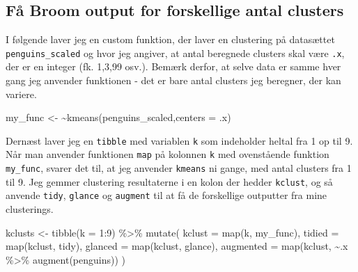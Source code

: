 \documentclass[
]{book}
\newenvironment{Shaded}{\begin{snugshade}}{\end{snugshade}}
\newcommand{\AttributeTok}[1]{\textcolor[rgb]{0.77,0.63,0.00}{#1}}
\newcommand{\DecValTok}[1]{\textcolor[rgb]{0.00,0.00,0.81}{#1}}
\newcommand{\ErrorTok}[1]{\textcolor[rgb]{0.64,0.00,0.00}{\textbf{#1}}}
\newcommand{\FunctionTok}[1]{\textcolor[rgb]{0.00,0.00,0.00}{#1}}
\newcommand{\NormalTok}[1]{#1}
\newcommand{\OtherTok}[1]{\textcolor[rgb]{0.56,0.35,0.01}{#1}}
\newcommand{\SpecialCharTok}[1]{\textcolor[rgb]{0.00,0.00,0.00}{#1}}
\begin{document}
\hypertarget{fuxe5-broom-output-for-forskellige-antal-clusters}{%
\subsection{Få Broom output for forskellige antal clusters}\label{fuxe5-broom-output-for-forskellige-antal-clusters}}

I følgende laver jeg en custom funktion, der laver en clustering på datasættet \texttt{penguins\_scaled} og hvor jeg angiver, at antal beregnede clusters skal være \texttt{.x}, der er en integer (fk. 1,3,99 osv.). Bemærk derfor, at selve data er samme hver gang jeg anvender funktionen - det er bare antal clusters jeg beregner, der kan variere.

\begin{Shaded}
\begin{Highlighting}[]
\NormalTok{my\_func }\OtherTok{\textless{}{-}} \ErrorTok{\textasciitilde{}}\FunctionTok{kmeans}\NormalTok{(penguins\_scaled,}\AttributeTok{centers =}\NormalTok{ .x)}
\end{Highlighting}
\end{Shaded}

Dernæst laver jeg en \texttt{tibble} med variablen \texttt{k} som indeholder heltal fra 1 op til 9. Når man anvender funktionen \texttt{map} på kolonnen \texttt{k} med ovenstående funktion \texttt{my\_func}, svarer det til, at jeg anvender \texttt{kmeans} ni gange, med antal clusters fra 1 til 9. Jeg gemmer clustering resultaterne i en kolon der hedder \texttt{kclust}, og så anvende \texttt{tidy}, \texttt{glance} og \texttt{augment} til at få de forskellige outputter fra mine clusterings.

\begin{Shaded}
\begin{Highlighting}[]
\NormalTok{kclusts }\OtherTok{\textless{}{-}} 
  \FunctionTok{tibble}\NormalTok{(}\AttributeTok{k =} \DecValTok{1}\SpecialCharTok{:}\DecValTok{9}\NormalTok{) }\SpecialCharTok{\%\textgreater{}\%}
  \FunctionTok{mutate}\NormalTok{( }\AttributeTok{kclust =} \FunctionTok{map}\NormalTok{(k, my\_func),}
          \AttributeTok{tidied =} \FunctionTok{map}\NormalTok{(kclust, tidy),}
          \AttributeTok{glanced =} \FunctionTok{map}\NormalTok{(kclust, glance),}
          \AttributeTok{augmented =} \FunctionTok{map}\NormalTok{(kclust, }\SpecialCharTok{\textasciitilde{}}\NormalTok{.x }\SpecialCharTok{\%\textgreater{}\%} \FunctionTok{augment}\NormalTok{(penguins))}
\NormalTok{        )}
\end{Highlighting}
\end{Shaded}
\end{document}
